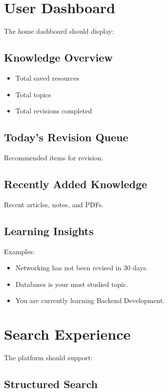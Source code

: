 \documentclass[11pt]{article}
\begin{document}
\section{User Dashboard}

The home dashboard should display:

\subsection{Knowledge Overview}
\begin{itemize}[nosep]
    \item Total saved resources
    \item Total topics
    \item Total revisions completed
\end{itemize}

\subsection{Today's Revision Queue}

Recommended items for revision.

\subsection{Recently Added Knowledge}

Recent articles, notes, and PDFs.

\subsection{Learning Insights}

Examples:
\begin{itemize}[nosep]
    \item Networking has not been revised in 30 days.
    \item Databases is your most studied topic.
    \item You are currently learning Backend Development.
\end{itemize}

\section{Search Experience}

The platform should support:

\subsection{Structured Search}
\end{document}
